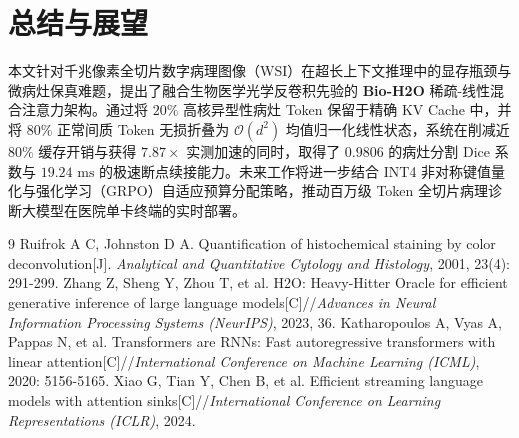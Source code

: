\documentclass[10pt,twocolumn,a4paper]{ctexart}
\begin{document}
\section{总结与展望}

本文针对千兆像素全切片数字病理图像（WSI）在超长上下文推理中的显存瓶颈与微病灶保真难题，提出了融合生物医学光学反卷积先验的 \textbf{Bio-H2O} 稀疏-线性混合注意力架构。通过将 $20\%$ 高核异型性病灶 Token 保留于精确 KV Cache 中，并将 $80\%$ 正常间质 Token 无损折叠为 $\mathcal{O}(d^2)$ 均值归一化线性状态，系统在削减近 $80\%$ 缓存开销与获得 $7.87\times$ 实测加速的同时，取得了 $0.9806$ 的病灶分割 Dice 系数与 $19.24\text{ ms}$ 的极速断点续接能力。未来工作将进一步结合 INT4 非对称键值量化与强化学习（GRPO）自适应预算分配策略，推动百万级 Token 全切片病理诊断大模型在医院单卡终端的实时部署。

\vspace{-0.2em}
{\scriptsize
\begin{thebibliography}{9}
\setlength{\itemsep}{-1pt}
 Ruifrok A C, Johnston D A. Quantification of histochemical staining by color deconvolution[J]. \emph{Analytical and Quantitative Cytology and Histology}, 2001, 23(4): 291-299.
 Zhang Z, Sheng Y, Zhou T, et al. H2O: Heavy-Hitter Oracle for efficient generative inference of large language models[C]//\emph{Advances in Neural Information Processing Systems (NeurIPS)}, 2023, 36.
 Katharopoulos A, Vyas A, Pappas N, et al. Transformers are RNNs: Fast autoregressive transformers with linear attention[C]//\emph{International Conference on Machine Learning (ICML)}, 2020: 5156-5165.
 Xiao G, Tian Y, Chen B, et al. Efficient streaming language models with attention sinks[C]//\emph{International Conference on Learning Representations (ICLR)}, 2024.
\end{thebibliography}
}
\end{document}
